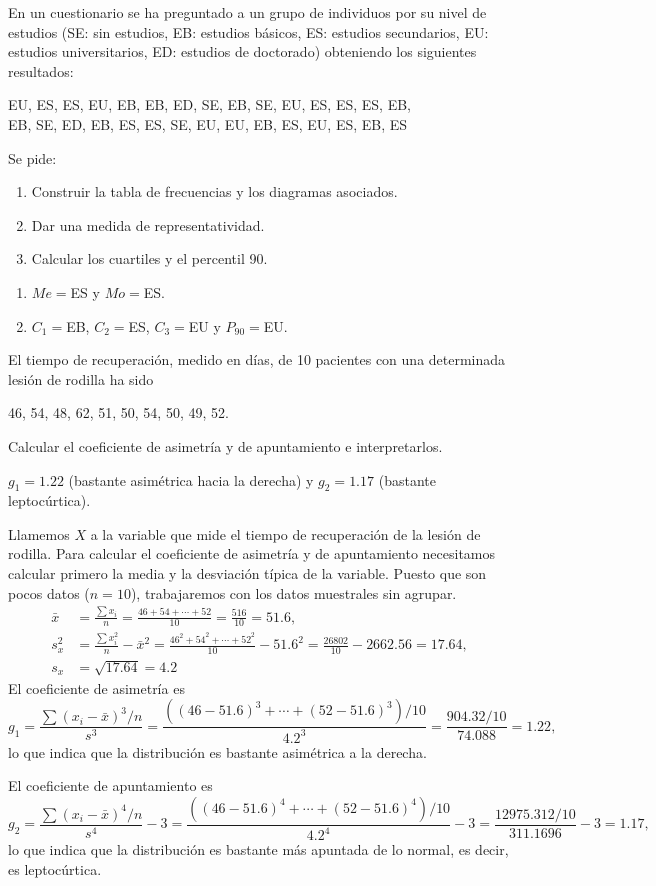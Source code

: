 {En un cuestionario se ha preguntado a un grupo de individuos por su nivel de estudios (SE: sin estudios, EB: estudios básicos, ES: estudios secundarios, EU: estudios universitarios, ED: estudios de doctorado) obteniendo los siguientes resultados:
\begin{center}
EU, ES, ES, EU, EB, EB, ED, SE, EB, SE, EU, ES, ES, ES, EB,\\
EB, SE, ED, EB, ES, ES, SE, EU, EU, EB, ES, EU, ES, EB, ES 
\end{center}
Se pide:
\begin{enumerate}
\item Construir la tabla de frecuencias y los diagramas asociados.
\item Dar una medida de representatividad.
\item Calcular los cuartiles y el percentil 90.
\end{enumerate}
}
{\begin{enumerate}[start=2]
\item $Me=$ES y $Mo=$ES.
\item $C_1=$EB, $C_2=$ES, $C_3=$EU y $P_{90}=$EU.
\end{enumerate}
}
{}


{El tiempo de recuperación, medido en días, de 10 pacientes con una determinada lesión de rodilla ha sido
\begin{center}
46, 54, 48, 62, 51, 50, 54, 50, 49, 52.
\end{center}
Calcular el coeficiente de asimetría y de apuntamiento e interpretarlos. 
}
{$g_1=1.22$ (bastante asimétrica hacia la derecha) y $g_2=1.17$ (bastante leptocúrtica).}
{Llamemos $X$ a la variable que mide el tiempo de recuperación de la lesión de rodilla.
Para calcular el coeficiente de asimetría y de apuntamiento necesitamos calcular primero la media y la desviación típica de la variable. Puesto que son pocos datos ($n=10$), trabajaremos con los datos muestrales sin agrupar.
\begin{align*}
\bar x &= \frac{\sum x_i}{n}=\frac{46+54+\cdots+52}{10}=\frac{516}{10}=51.6,\\
s_x^2 &= \frac{\sum x_i^2}{n}-\bar x^2=\frac{46^2+54^2+\cdots+52^2}{10}-51.6^2=\frac{26802}{10}-2662.56=17.64,\\
s_x &= \sqrt{17.64}=4.2
\end{align*}
El coeficiente de asimetría es
\[ g_1=\frac{\sum(x_i-\bar x)^3/n}{s^3}= \frac{((46-51.6)^3+\cdots+(52-51.6)^3)/10}{4.2^3}=\frac{904.32/10}{74.088}=1.22,
\]
lo que indica que la distribución es bastante asimétrica a la derecha.

El coeficiente de apuntamiento es
\[ g_2=\frac{\sum(x_i-\bar x)^4/n}{s^4}-3= \frac{((46-51.6)^4+\cdots+(52-51.6)^4)/10}{4.2^4}-3=\frac{12975.312/10}{311.1696}-3=1.17,
\]
lo que indica que la distribución es bastante más apuntada de lo normal, es decir, es leptocúrtica.
}


